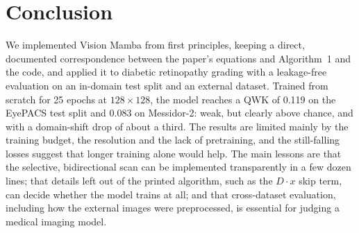 \documentclass[11pt,a4paper]{article}
\begin{document}
\section{Conclusion}

We implemented Vision Mamba from first principles, keeping a direct, documented
correspondence between the paper's equations and Algorithm~1 and the code, and
applied it to diabetic retinopathy grading with a leakage-free evaluation on an
in-domain test split and an external dataset. Trained from scratch for 25 epochs at
$128\times128$, the model reaches a QWK of 0.119 on the EyePACS test split and 0.083
on Messidor-2: weak, but clearly above chance, and with a domain-shift drop of about
a third. The results are limited mainly by the training budget, the resolution and
the lack of pretraining, and the still-falling losses suggest that longer training
alone would help.
The main lessons are that the selective, bidirectional scan can be implemented
transparently in a few dozen lines; that details left out of the printed algorithm,
such as the $D\cdot x$ skip term, can decide whether the model trains at all; and
that cross-dataset evaluation, including how the external images were preprocessed,
is essential for judging a medical imaging model.



\end{document}
